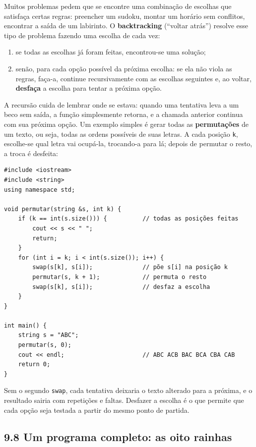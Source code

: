 Muitos problemas pedem que se encontre uma combinação de escolhas que satisfaça certas regras: preencher um sudoku, montar um horário sem conflitos, encontrar a saída de um labirinto. O \textbf{backtracking} (``voltar atrás'') resolve esse tipo de problema fazendo uma escolha de cada vez:

\begin{enumerate}
  \item se todas as escolhas já foram feitas, encontrou-se uma solução;
  \item senão, para cada opção possível da próxima escolha: se ela não viola as regras, faça-a, continue recursivamente com as escolhas seguintes e, ao voltar, \textbf{desfaça} a escolha para tentar a próxima opção.
\end{enumerate}

A recursão cuida de lembrar onde se estava: quando uma tentativa leva a um beco sem saída, a função simplesmente retorna, e a chamada anterior continua com sua próxima opção. Um exemplo simples é gerar todas as \textbf{permutações} de um texto, ou seja, todas as ordens possíveis de suas letras. A cada posição \texttt{k}, escolhe-se qual letra vai ocupá-la, trocando-a para lá; depois de permutar o resto, a troca é desfeita:

\begin{codigo}
\begin{Verbatim}[breaklines=true, breaksymbolleft={}, fontsize=\footnotesize]
#include <iostream>
#include <string>
using namespace std;

void permutar(string &s, int k) {
    if (k == int(s.size())) {          // todas as posições feitas
        cout << s << " ";
        return;
    }
    for (int i = k; i < int(s.size()); i++) {
        swap(s[k], s[i]);              // põe s[i] na posição k
        permutar(s, k + 1);            // permuta o resto
        swap(s[k], s[i]);              // desfaz a escolha
    }
}

int main() {
    string s = "ABC";
    permutar(s, 0);
    cout << endl;                      // ABC ACB BAC BCA CBA CAB
    return 0;
}
\end{Verbatim}
\end{codigo}

Sem o segundo \texttt{swap}, cada tentativa deixaria o texto alterado para a próxima, e o resultado sairia com repetições e faltas. Desfazer a escolha é o que permite que cada opção seja testada a partir do mesmo ponto de partida.

\subsection{9.8 Um programa completo: as oito rainhas}

